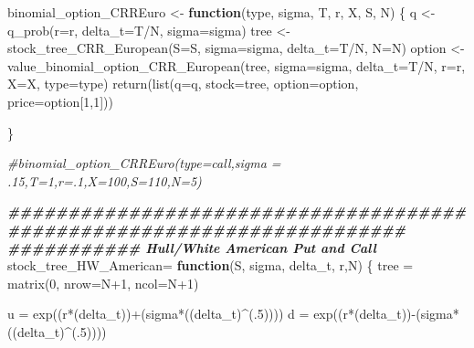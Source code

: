 \documentclass[
]{article}
\newenvironment{Shaded}{\begin{snugshade}}{\end{snugshade}}
\newcommand{\AttributeTok}[1]{\textcolor[rgb]{0.77,0.63,0.00}{#1}}
\newcommand{\CommentTok}[1]{\textcolor[rgb]{0.56,0.35,0.01}{\textit{#1}}}
\newcommand{\ControlFlowTok}[1]{\textcolor[rgb]{0.13,0.29,0.53}{\textbf{#1}}}
\newcommand{\DecValTok}[1]{\textcolor[rgb]{0.00,0.00,0.81}{#1}}
\newcommand{\DocumentationTok}[1]{\textcolor[rgb]{0.56,0.35,0.01}{\textbf{\textit{#1}}}}
\newcommand{\FunctionTok}[1]{\textcolor[rgb]{0.00,0.00,0.00}{#1}}
\newcommand{\NormalTok}[1]{#1}
\newcommand{\OtherTok}[1]{\textcolor[rgb]{0.56,0.35,0.01}{#1}}
\newcommand{\SpecialCharTok}[1]{\textcolor[rgb]{0.00,0.00,0.00}{#1}}
\begin{document}
\begin{Shaded}
\begin{Highlighting}[]
\NormalTok{binomial\_option\_CRREuro }\OtherTok{\textless{}{-}} \ControlFlowTok{function}\NormalTok{(type, sigma, T, r, X, S, N) \{}
\NormalTok{  q }\OtherTok{\textless{}{-}} \FunctionTok{q\_prob}\NormalTok{(}\AttributeTok{r=}\NormalTok{r, }\AttributeTok{delta\_t=}\NormalTok{T}\SpecialCharTok{/}\NormalTok{N, }\AttributeTok{sigma=}\NormalTok{sigma)}
\NormalTok{  tree }\OtherTok{\textless{}{-}} \FunctionTok{stock\_tree\_CRR\_European}\NormalTok{(}\AttributeTok{S=}\NormalTok{S, }\AttributeTok{sigma=}\NormalTok{sigma, }\AttributeTok{delta\_t=}\NormalTok{T}\SpecialCharTok{/}\NormalTok{N, }\AttributeTok{N=}\NormalTok{N)}
\NormalTok{  option }\OtherTok{\textless{}{-}} \FunctionTok{value\_binomial\_option\_CRR\_European}\NormalTok{(tree, }\AttributeTok{sigma=}\NormalTok{sigma, }\AttributeTok{delta\_t=}\NormalTok{T}\SpecialCharTok{/}\NormalTok{N, }\AttributeTok{r=}\NormalTok{r, }\AttributeTok{X=}\NormalTok{X, }\AttributeTok{type=}\NormalTok{type)}
  \FunctionTok{return}\NormalTok{(}\FunctionTok{list}\NormalTok{(}\AttributeTok{q=}\NormalTok{q, }\AttributeTok{stock=}\NormalTok{tree, }\AttributeTok{option=}\NormalTok{option, }\AttributeTok{price=}\NormalTok{option[}\DecValTok{1}\NormalTok{,}\DecValTok{1}\NormalTok{]))}
  
\NormalTok{\}}

\CommentTok{\#binomial\_option\_CRREuro(type=\textquotesingle{}call\textquotesingle{},sigma = .15,T=1,r=.1,X=100,S=110,N=5)}

\DocumentationTok{\#\#\#\#\#\#\#\#\#\#\#\#\#\#\#\#\#\#\#\#\#\#\#\#\#\#\#\#\#\#\#\#\#\#\#\#\#\#\#\#\#\#\#\#\#\#\#\#\#\#\#\#\#\#\#\#\#\#\#\#\#\#\#\#\#\#\#\#\#\#\#}
\DocumentationTok{\#\#\#\#\#\#\#\#\#\#\# Hull/White American Put and Call}
\NormalTok{stock\_tree\_HW\_American}\OtherTok{=} \ControlFlowTok{function}\NormalTok{(S, sigma, delta\_t, r,N) \{}
\NormalTok{  tree }\OtherTok{=} \FunctionTok{matrix}\NormalTok{(}\DecValTok{0}\NormalTok{, }\AttributeTok{nrow=}\NormalTok{N}\SpecialCharTok{+}\DecValTok{1}\NormalTok{, }\AttributeTok{ncol=}\NormalTok{N}\SpecialCharTok{+}\DecValTok{1}\NormalTok{)}
  
\NormalTok{  u }\OtherTok{=} \FunctionTok{exp}\NormalTok{((r}\SpecialCharTok{*}\NormalTok{(delta\_t))}\SpecialCharTok{+}\NormalTok{(sigma}\SpecialCharTok{*}\NormalTok{((delta\_t)}\SpecialCharTok{\^{}}\NormalTok{(.}\DecValTok{5}\NormalTok{))))}
\NormalTok{  d }\OtherTok{=} \FunctionTok{exp}\NormalTok{((r}\SpecialCharTok{*}\NormalTok{(delta\_t))}\SpecialCharTok{{-}}\NormalTok{(sigma}\SpecialCharTok{*}\NormalTok{((delta\_t)}\SpecialCharTok{\^{}}\NormalTok{(.}\DecValTok{5}\NormalTok{))))}
  

\end{Highlighting}
\end{Shaded}
\end{document}

